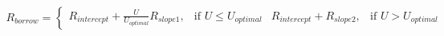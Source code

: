 \documentclass[preview]{standalone}
\begin{document}
\begin{align*}
R_{borrow} = \begin{cases} R_{intercept} + \frac{ U }{ U _{optimal}}R_{slope1}, & \text{if }  U  \leq  U _{optimal} &R_{intercept} + R_{slope2}, & \text{if }  U  >  U _{optimal} \end{cases}
\end{align*}
\end{document}
